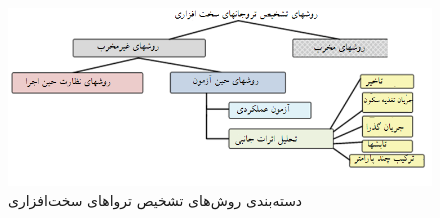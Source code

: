 \begin{figure}
\begin{center}
\includegraphics[scale=.8]{figs/fig1-4.png}
\caption{دسته‌بندی روش‌های تشخیص ترواهای سخت‌افزاری}
\label{fig1-4}
\end{center}
\end{figure} 

